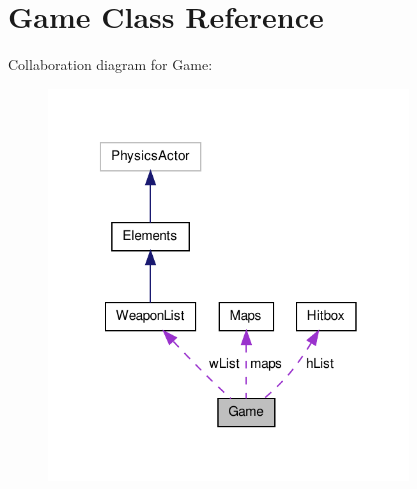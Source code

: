 \hypertarget{class_game}{\section{Game Class Reference}
\label{class_game}
}


Collaboration diagram for Game\-:\nopagebreak
\begin{figure}[H]
\begin{center}
\leavevmode
\includegraphics[width=271pt]{class_game__coll__graph}
\end{center}
\end{figure}
